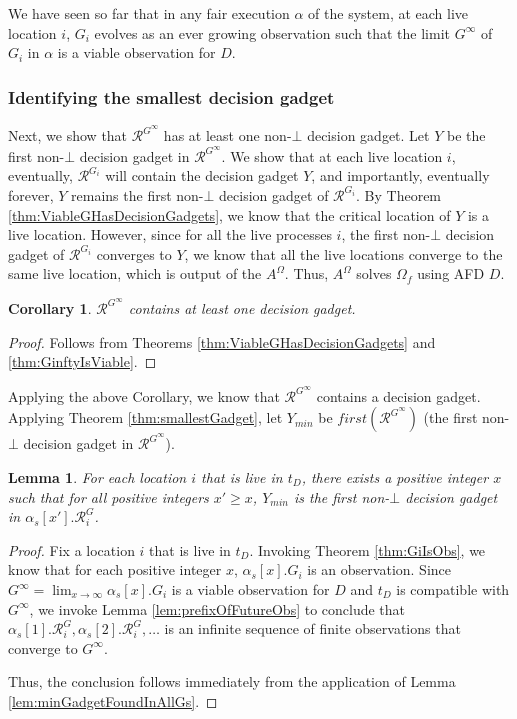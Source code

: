 \documentclass[11pt]{article}
\numberwithin{theorem}{section}
\newtheorem{lemma}[theorem]{Lemma}
\newtheorem{corollary}[theorem]{Corollary}
\begin{document}
We have seen so far that in any fair execution $\alpha$ of the system, at
each live location $i$, $G_i$ evolves as an ever growing observation such that
the limit $G^\infty$ of $G_i$ in $\alpha$ is a viable observation for $D$. 




\subsubsection{Identifying the smallest decision gadget}\label{subsubsec:proofSmallestDecisionGadget}
Next, we show that $\mathcal{R}^{G^\infty}$ has at least one non-$\bot$ decision gadget. Let $Y$ be the first non-$\bot$ decision gadget in $\mathcal{R}^{G^\infty}$. We show that at
each live location $i$, eventually, $\mathcal{R}^{G_i}$ will contain the decision gadget $Y$, and importantly, eventually forever, $Y$ remains the first non-$\bot$ decision gadget of $\mathcal{R}^{G_i}$. By Theorem \ref{thm:ViableGHasDecisionGadgets}, we know that the critical location of $Y$ is a live location. However, since for all the live processes $i$, the first non-$\bot$ decision gadget of $\mathcal{R}^{G_i}$ converges to $Y$, we know that all the live locations converge to the same live location, which is output of the $A^\Omega$. Thus, $A^\Omega$ solves $\Omega_f$ using AFD $D$.

\begin{corollary}\label{cor:GinftyHasDecisionGadget}
$\mathcal{R}^{G^\infty}$ contains at least one decision gadget.
\end{corollary}
\begin{proof}
Follows from Theorems \ref{thm:ViableGHasDecisionGadgets} and \ref{thm:GinftyIsViable}.
\end{proof}

Applying the above Corollary, we know that $\mathcal{R}^{G^\infty}$ contains a decision gadget. Applying  Theorem \ref{thm:smallestGadget}, let $Y_{min}$ be $first(\mathcal{R}^{G^\infty})$ (the first non-$\bot$ decision gadget in $\mathcal{R}^{G^\infty}$).

\begin{lemma}\label{lem:minGadgetFound}
For each location $i$ that is live in $t_D$, there exists a positive integer $x$ such that for all positive integers $x' \geq x$, $Y_{min}$ is the first non-$\bot$ decision gadget in $\alpha_s[x'].\mathcal{R}^G_i$.
\end{lemma}
\begin{proof}
Fix a location $i$ that is live in $t_D$.
Invoking Theorem \ref{thm:GiIsObs}, we know that for each positive integer $x$, $\alpha_s[x].G_i$ is an observation.
Since $G^\infty = \lim_{x \rightarrow \infty} \alpha_s[x].G_i$ is a viable observation for $D$ and $t_D$ is compatible with $G^\infty$, we invoke Lemma \ref{lem:prefixOfFutureObs} to conclude that $\alpha_s[1].\mathcal{R}^G_i, \alpha_s[2].\mathcal{R}^G_i, \ldots$ is an infinite sequence of finite observations that converge to $G^\infty$.

Thus, the conclusion follows immediately from the application of Lemma \ref{lem:minGadgetFoundInAllGs}.

\end{proof}
\end{document}
